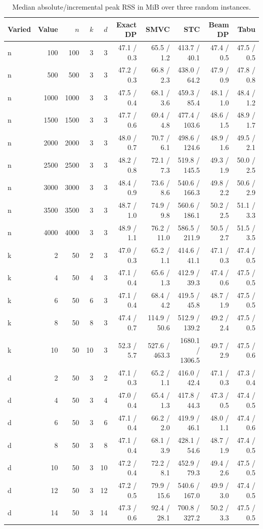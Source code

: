 \begin{table}[t]
\centering
\scriptsize
\caption{Median absolute/incremental peak RSS in MiB over three random instances.}
\label{tab:experiment-7-memory}
\begin{tabular}{lrrrrrrrrr}
\toprule
Varied & Value & $n$ & $k$ & $d$ & Exact DP & SMVC & STC & Beam DP & Tabu \\
\midrule
n & 100 & 100 & 3 & 3 & 47.1 / 0.3 & 65.5 / 1.2 & 413.7 / 40.1 & 47.4 / 0.5 & 47.5 / 0.5 \\
n & 500 & 500 & 3 & 3 & 47.2 / 0.3 & 66.8 / 2.3 & 438.0 / 64.2 & 47.9 / 0.9 & 47.8 / 0.8 \\
n & 1000 & 1000 & 3 & 3 & 47.5 / 0.4 & 68.1 / 3.6 & 459.3 / 85.4 & 48.1 / 1.0 & 48.4 / 1.2 \\
n & 1500 & 1500 & 3 & 3 & 47.7 / 0.6 & 69.4 / 4.8 & 477.4 / 103.6 & 48.6 / 1.5 & 48.9 / 1.7 \\
n & 2000 & 2000 & 3 & 3 & 48.0 / 0.7 & 70.7 / 6.1 & 498.6 / 124.6 & 48.9 / 1.6 & 49.5 / 2.1 \\
n & 2500 & 2500 & 3 & 3 & 48.2 / 0.8 & 72.1 / 7.3 & 519.8 / 145.5 & 49.3 / 1.9 & 50.0 / 2.5 \\
n & 3000 & 3000 & 3 & 3 & 48.4 / 0.9 & 73.6 / 8.6 & 540.6 / 166.3 & 49.8 / 2.2 & 50.6 / 2.9 \\
n & 3500 & 3500 & 3 & 3 & 48.7 / 1.0 & 74.9 / 9.8 & 560.6 / 186.1 & 50.2 / 2.5 & 51.1 / 3.3 \\
n & 4000 & 4000 & 3 & 3 & 48.9 / 1.1 & 76.2 / 11.0 & 586.5 / 211.9 & 50.5 / 2.7 & 51.5 / 3.5 \\
k & 2 & 50 & 2 & 3 & 47.0 / 0.3 & 65.2 / 1.1 & 414.6 / 41.1 & 47.1 / 0.3 & 47.4 / 0.5 \\
k & 4 & 50 & 4 & 3 & 47.1 / 0.4 & 65.6 / 1.3 & 412.9 / 39.3 & 47.4 / 0.6 & 47.5 / 0.5 \\
k & 6 & 50 & 6 & 3 & 47.1 / 0.4 & 68.4 / 4.2 & 419.5 / 45.8 & 48.7 / 1.9 & 47.5 / 0.5 \\
k & 8 & 50 & 8 & 3 & 47.4 / 0.7 & 114.9 / 50.6 & 512.9 / 139.2 & 49.2 / 2.4 & 47.5 / 0.5 \\
k & 10 & 50 & 10 & 3 & 52.3 / 5.7 & 527.6 / 463.3 & 1680.1 / 1306.5 & 49.7 / 2.9 & 47.5 / 0.6 \\
d & 2 & 50 & 3 & 2 & 47.1 / 0.3 & 65.2 / 1.1 & 416.0 / 42.4 & 47.1 / 0.3 & 47.3 / 0.4 \\
d & 4 & 50 & 3 & 4 & 47.0 / 0.4 & 65.4 / 1.3 & 417.8 / 44.3 & 47.3 / 0.5 & 47.4 / 0.5 \\
d & 6 & 50 & 3 & 6 & 47.1 / 0.4 & 66.2 / 2.0 & 419.9 / 46.1 & 48.0 / 1.1 & 47.4 / 0.6 \\
d & 8 & 50 & 3 & 8 & 47.1 / 0.4 & 68.1 / 3.9 & 428.1 / 54.6 & 48.7 / 1.9 & 47.4 / 0.5 \\
d & 10 & 50 & 3 & 10 & 47.2 / 0.4 & 72.2 / 8.1 & 452.9 / 79.3 & 49.4 / 2.6 & 47.5 / 0.5 \\
d & 12 & 50 & 3 & 12 & 47.2 / 0.5 & 79.9 / 15.6 & 540.6 / 167.0 & 49.9 / 3.0 & 47.4 / 0.5 \\
d & 14 & 50 & 3 & 14 & 47.3 / 0.6 & 92.4 / 28.1 & 700.8 / 327.2 & 50.2 / 3.3 & 47.5 / 0.5 \\
\bottomrule
\end{tabular}
\end{table}
